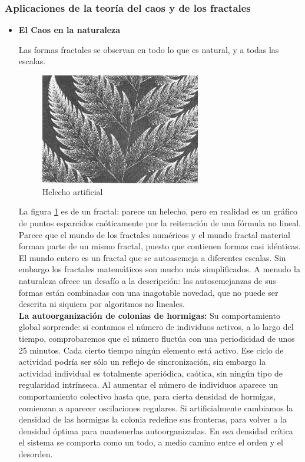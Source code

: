 \documentclass[letterpaper, 11pt, oneside]{article}
\theoremstyle{definition}
\theoremstyle{remark}
\begin{document}
\subsubsection{Aplicaciones de la teoría del caos y de los fractales}
\begin{itemize}
\item {\bf El Caos en la naturaleza \par}

Las formas fractales se observan en todo lo que es natural, y a todas las escalas.\cite{multimania}


\begin{figure}[ht]
	\begin{center}
		\includegraphics[width=7cm]{Imagenes/helecho.jpg}
	\end{center}
	\caption{Helecho artificial}
	\label{helecho}
\end{figure}

La figura \ref{helecho} es de un fractal: parece un helecho, pero en realidad es un gráfico de puntos esparcidos caóticamente por la reiteración de una fórmula no lineal.
Parece que el mundo de los fractales numéricos y el mundo fractal material forman parte de un mismo fractal, puesto que contienen formas casi idénticas. El mundo entero es un fractal que se autoasemeja a diferentes escalas. Sin embargo los fractales matemáticos son mucho más simplificados. A menudo la naturaleza ofrece un desafío a la descripción: las autosemejanzas de sus formas están combinadas con una inagotable novedad, que no puede ser descrita ni siquiera por algoritmos no lineales. \\

{\bf La autoorganización de colonias de hormigas: }Su comportamiento global sorprende: si contamos el número de individuos activos, a lo largo del tiempo, comprobaremos que el número fluctúa con una periodicidad de unos 25 minutos. Cada cierto tiempo ningún elemento está activo. Ese ciclo de actividad podría ser sólo un reflejo de sincronización, sin embargo la actividad individual es totalmente aperiódica, caótica, sin ningún tipo de regularidad intrínseca. 
Al aumentar el número de individuos aparece un comportamiento colectivo hasta que, para cierta densidad de hormigas, comienzan a aparecer oscilaciones regulares. Si artificialmente cambiamos la densidad de las hormigas la colonia redefine sus fronteras, para volver a la densidad óptima para mantenerlas autoorganizadas. En esa densidad crítica el sistema se comporta como un todo, a medio camino entre el orden y el desorden. \\


\end{itemize}
\end{document}
